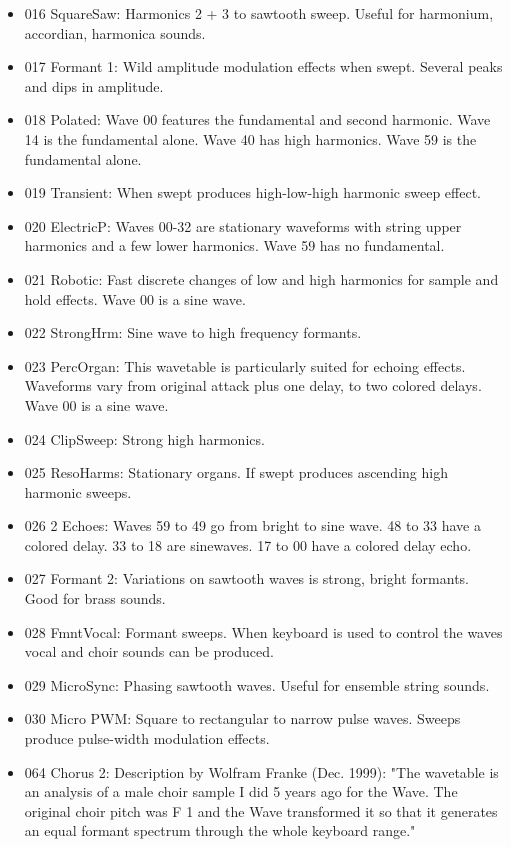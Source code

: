 \begin{itemize}
	\item 016 SquareSaw: Harmonics 2 + 3 to sawtooth sweep. Useful for harmonium, accordian, harmonica sounds.
	\item 017 Formant 1: Wild amplitude modulation effects when swept. Several peaks and dips in amplitude.
	\item 018 Polated: Wave 00 features the fundamental and second harmonic. Wave 14 is the fundamental alone. Wave 40 has high harmonics. Wave 59 is the fundamental alone.
	\item 019 Transient: When swept produces high-low-high harmonic sweep effect.
	\item 020 ElectricP: Waves 00-32 are stationary waveforms with string upper harmonics and a few lower harmonics. Wave 59 has no fundamental.
	\item 021 Robotic: Fast discrete changes of low and high harmonics for sample and hold effects. Wave 00 is a sine wave.
	\item 022 StrongHrm: Sine wave to high frequency formants.
	\item 023 PercOrgan: This wavetable is particularly suited for echoing effects. Waveforms vary from original attack plus one delay, to two colored delays. Wave 00 is a sine wave.
	\item 024 ClipSweep: Strong high harmonics.
	\item 025 ResoHarms: Stationary organs. If swept produces ascending high harmonic sweeps.
	\item 026 2 Echoes:	Waves 59 to 49 go from bright to sine wave. 48 to 33 have a colored delay. 33 to 18 are sinewaves. 17 to 00 have a colored delay echo.
	\item 027 Formant 2: Variations on sawtooth waves is strong, bright formants. Good for brass sounds.
	\item 028 FmntVocal: Formant sweeps. When keyboard is used to control the waves vocal and choir sounds can be produced.
	\item 029 MicroSync: Phasing sawtooth waves. Useful for ensemble string sounds.
	\item 030 Micro PWM: Square to rectangular to narrow pulse waves. Sweeps produce pulse-width modulation effects.
	\item 064 Chorus 2: Description by Wolfram Franke (Dec. 1999): "The wavetable is an analysis of a
	male choir sample I did 5 years ago for the Wave. The original choir pitch
	was F 1 and the Wave transformed it so that it generates an equal formant
	spectrum through the whole keyboard range."
\end{itemize}

